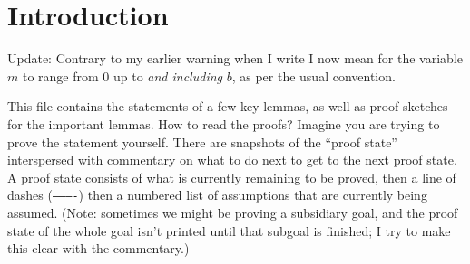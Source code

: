 \documentclass{article}
\newcommand{\HOLAsmSep}{\texttt{----------}}
\begin{document}
\section*{Introduction}
Update: Contrary to my earlier warning when I write  I now mean for the variable $m$ to range from $0$ up to \emph{and including} $b$, as per the usual convention.

This file contains the statements of a few key lemmas, as well as proof sketches for the important lemmas.
How to read the proofs?
Imagine you are trying to prove the statement yourself.
There are snapshots of the ``proof state'' interspersed with commentary on what to do next to get to the next proof state.
A proof state consists of what is currently remaining to be proved, then a line of dashes (\HOLAsmSep{}) then a numbered list of assumptions that are currently being assumed.
(Note: sometimes we might be proving a subsidiary goal, and the proof state of the whole goal isn't printed until that subgoal is finished; I try to make this clear with the commentary.)
\end{document}
